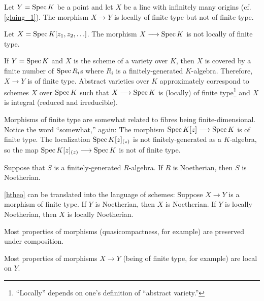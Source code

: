 \documentclass [11 pt, oneside] {article}
\begin{document}
\begin{example}[ ]\label{}\text{}
Let $Y=\operatorname{Spec} K$ be a point and let $X$ be a line with infinitely many origins (cf. \cref{gluing_1}). The morphism $X\longrightarrow Y$ is locally of finite type but not of finite type.
\end{example}

\begin{example}[ ]\label{}\text{}
Let $X =\operatorname{Spec} K[z_1,z_2,\hdots]$. The morphism $X \longrightarrow \operatorname{Spec} K$ is not locally of finite type.
\end{example}

If $Y=\operatorname{Spec} K$ and $X $ is the scheme of a variety over $K$, then $X$ is covered by a finite number of $\operatorname{Spec} R_i$s where $R_i$ is a finitely-generated $K$-algebra. Therefore, $X \longrightarrow Y$ is of finite type. Abstract varieties over $K$ approximately correspond to schemes $X$ over $\operatorname{Spec} K$ such that $X\longrightarrow \operatorname{Spec} K$ is (locally) of finite type\footnote{``Locally'' depends on one's definition of ``abstract variety.''} and $X$ is integral (reduced and irreducible). 

Morphisms of finite type are somewhat related to fibres being finite-dimensional. Notice the word ``somewhat,'' again: The morphism $\operatorname{Spec} K[z] \longrightarrow \operatorname{Spec} K$ is of finite type. The localization $\operatorname{Spec} K[z]_{(z)}$ is not finitely-generated as a $K$-algebra, so the map $\operatorname{Spec} K[z]_{(z)} \longrightarrow \operatorname{Spec} K$ is not of finite type.

\begin{theorem}[Hilbert]\label{htheo}\text{}
Suppose that $S$ is a finitely-generated $R$-algebra. If $R$ is Noetherian, then $S$ is Noetherian.
\end{theorem}

\begin{remark}
	\cref{htheo} can be translated into the language of schemes: Suppose $X\longrightarrow Y$ is a morphism of finite type. If $Y$ is Noetherian, then $X$ is Noetherian. If $Y$ is locally Noetherian, then $X$ is locally Noetherian.
\end{remark}

\begin{remark}
	Most properties of morphisms (quasicompactness, for example) are preserved under composition.
\end{remark}

\begin{remark}
	Most properties of morphisms $X\longrightarrow Y$ (being of finite type, for example) are local on $Y$.
\end{remark}
\end{document}
